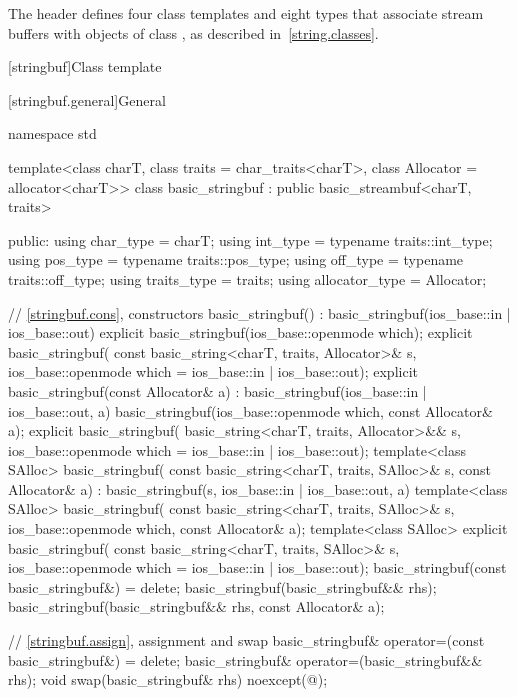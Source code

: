 \pnum
The header  defines four class templates
and eight types that associate stream buffers with objects of class
,
%
as described in~\ref{string.classes}.

[stringbuf]{Class template }

[stringbuf.general]{General}
%
\begin{codeblock}
namespace std {
  template<class charT, class traits = char_traits<charT>,
           class Allocator = allocator<charT>>
  class basic_stringbuf : public basic_streambuf<charT, traits> {
  public:
    using char_type      = charT;
    using int_type       = typename traits::int_type;
    using pos_type       = typename traits::pos_type;
    using off_type       = typename traits::off_type;
    using traits_type    = traits;
    using allocator_type = Allocator;

    // \ref{stringbuf.cons}, constructors
    basic_stringbuf() : basic_stringbuf(ios_base::in | ios_base::out) {}
    explicit basic_stringbuf(ios_base::openmode which);
    explicit basic_stringbuf(
      const basic_string<charT, traits, Allocator>& s,
      ios_base::openmode which = ios_base::in | ios_base::out);
    explicit basic_stringbuf(const Allocator& a)
      : basic_stringbuf(ios_base::in | ios_base::out, a) {}
    basic_stringbuf(ios_base::openmode which, const Allocator& a);
    explicit basic_stringbuf(
      basic_string<charT, traits, Allocator>&& s,
      ios_base::openmode which = ios_base::in | ios_base::out);
    template<class SAlloc>
      basic_stringbuf(
        const basic_string<charT, traits, SAlloc>& s, const Allocator& a)
        : basic_stringbuf(s, ios_base::in | ios_base::out, a) {}
    template<class SAlloc>
      basic_stringbuf(
        const basic_string<charT, traits, SAlloc>& s,
        ios_base::openmode which, const Allocator& a);
    template<class SAlloc>
      explicit basic_stringbuf(
        const basic_string<charT, traits, SAlloc>& s,
        ios_base::openmode which = ios_base::in | ios_base::out);
    basic_stringbuf(const basic_stringbuf&) = delete;
    basic_stringbuf(basic_stringbuf&& rhs);
    basic_stringbuf(basic_stringbuf&& rhs, const Allocator& a);

    // \ref{stringbuf.assign}, assignment and swap
    basic_stringbuf& operator=(const basic_stringbuf&) = delete;
    basic_stringbuf& operator=(basic_stringbuf&& rhs);
    void swap(basic_stringbuf& rhs) noexcept(@\seebelow@);

}}
\end{codeblock}
